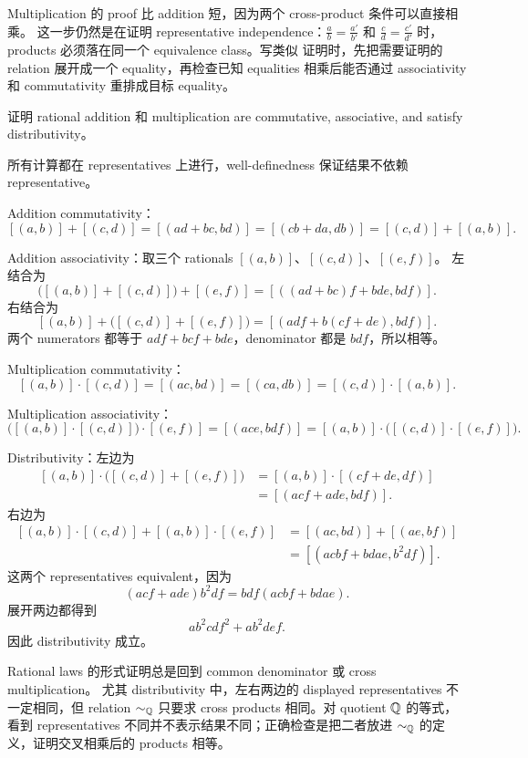 \begin{explanation}
Multiplication 的 proof 比 addition 短，因为两个 cross-product 条件可以直接相乘。
这一步仍然是在证明 representative independence：\(\frac ab=\frac{a'}{b'}\) 和
\(\frac cd=\frac{c'}{d'}\) 时，products 必须落在同一个 equivalence class。写类似
证明时，先把需要证明的 relation 展开成一个 equality，再检查已知 equalities
相乘后能否通过 associativity 和 commutativity 重排成目标 equality。
\end{explanation}

\begin{exerciseblock}
证明 rational addition 和 multiplication are commutative, associative, and satisfy
distributivity。
\end{exerciseblock}

\begin{solution}
所有计算都在 representatives 上进行，well-definedness 保证结果不依赖
representative。

Addition commutativity：
\[
[(a,b)]+[(c,d)]
=[(ad+bc,bd)]
=[(cb+da,db)]
=[(c,d)]+[(a,b)].
\]

Addition associativity：取三个 rationals \([(a,b)]\)、\([(c,d)]\)、\([(e,f)]\)。
左结合为
\[
\bigl([(a,b)]+[(c,d)]\bigr)+[(e,f)]
=[((ad+bc)f+bde,bdf)].
\]
右结合为
\[
[(a,b)]+\bigl([(c,d)]+[(e,f)]\bigr)
=[(adf+b(cf+de),bdf)].
\]
两个 numerators 都等于 \(adf+bcf+bde\)，denominator 都是 \(bdf\)，所以相等。

Multiplication commutativity：
\[
[(a,b)]\cdot[(c,d)]
=[(ac,bd)]
=[(ca,db)]
=[(c,d)]\cdot[(a,b)].
\]

Multiplication associativity：
\[
\bigl([(a,b)]\cdot[(c,d)]\bigr)\cdot[(e,f)]
=[(ace,bdf)]
=[(a,b)]\cdot\bigl([(c,d)]\cdot[(e,f)]\bigr).
\]

Distributivity：左边为
\[
\begin{aligned}
[(a,b)]\cdot\bigl([(c,d)]+[(e,f)]\bigr)
  &=[(a,b)]\cdot[(cf+de,df)]\\
  &=[(acf+ade,bdf)].
\end{aligned}
\]
右边为
\[
\begin{aligned}
[(a,b)]\cdot[(c,d)]+[(a,b)]\cdot[(e,f)]
  &=[(ac,bd)]+[(ae,bf)]\\
  &=[(acbf+bdae,b^2df)].
\end{aligned}
\]
这两个 representatives equivalent，因为
\[
  (acf+ade)b^2df=bdf(acbf+bdae).
\]
展开两边都得到
\[
  ab^2cdf^2+ab^2def.
\]
因此 distributivity 成立。
\end{solution}

\begin{explanation}
Rational laws 的形式证明总是回到 common denominator 或 cross multiplication。
尤其 distributivity 中，左右两边的 displayed representatives 不一定相同，但
relation \(\sim_{\mathbb{Q}}\) 只要求 cross products 相同。对 quotient \(\mathbb{Q}\) 的等式，
看到 representatives 不同并不表示结果不同；正确检查是把二者放进
\(\sim_{\mathbb{Q}}\) 的定义，证明交叉相乘后的 products 相等。
\end{explanation}

